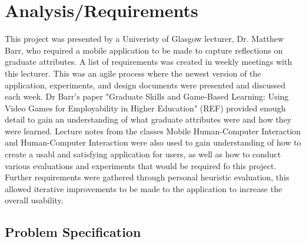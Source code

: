 \documentclass{l4proj}
\begin{document}
\chapter{Analysis/Requirements}

This project was presented by a Univeristy of Glasgow lecturer, Dr. Matthew Barr, who required a mobile application to be made 
to capture reflections on graduate attributes. A list of requirements was created in weekly meetings with this lecturer.
This was an agile process where the newest version of the application, experiments, and design documents were presented
and discussed each week. Dr Barr's paper "Graduate Skills and Game-Based Learning: Using Video Games for Employability in Higher 
Education" (REF) provided enough detail to gain an understanding of what graduate attributes were and how they were learned. 
Lecture notes from the classes Mobile Human-Computer Interaction and Human-Computer Interaction were also used to gain understanding
of how to create a usabl and satisfying application for users, as well as how to conduct various evaluations and experiments that would
be required fo this project.
Further requirements were gathered through personal heuristic evaluation, this allowed iterative improvements to be made to the
application to increase the overall usability.

\section{Problem Specification}
\end{document}
